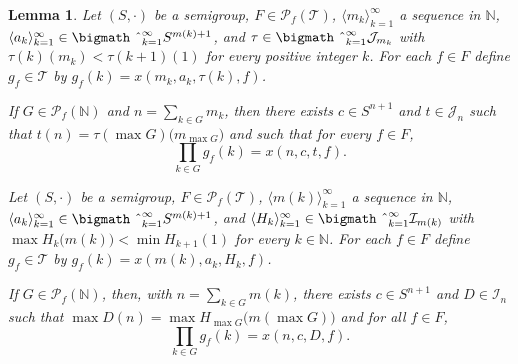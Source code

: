 \documentclass[12pt]{article}
\theoremstyle{plain}
\newtheorem{lem}[thm]{Lemma}
\theoremstyle{definition}
\newcommand{\la}{\langle}
\newcommand{\ra}{\rangle}
\newcommand{\bbN}{\mathbb{N}}
\newcommand{\calI}{\mathcal{I}}
\newcommand{\calJ}{\mathcal{J}}
\newcommand{\calT}{\mathcal{T}}
\newcommand{\Pf}{\mathcal{P}_f}
\newcommand{\bigtimes}{\hbox{\bigmath \char'2}}
\begin{document}
\begin{lem}
  \label{lem:prodrewrt}
  Let $(S, \cdot)$ be a semigroup, $F \in \Pf(\calT)$, $\la m_k \ra_{k=1}^\infty$ a sequence in $\bbN$, $\la a_k \ra_{k=1}^\infty \in \bigtimes_{k=1}^\infty S^{m(k)+1}$, and $\tau \in \bigtimes_{k=1}^\infty \calJ_{m_k}$ with $\tau(k)(m_k) < \tau(k+1)(1)$ for every positive integer $k$.
  For each $f \in F$ define $g_f \in \calT$ by $g_f(k) = x(m_k, a_k, \tau(k), f)$.

  If $G \in \Pf(\bbN)$ and $n = \sum_{k \in G} m_k$, then there exists $c \in S^{n+1}$ and $t \in \calJ_n$ such that $t(n) = \tau(\max G)\bigl( m_{\max G}\bigr)$ and such that for every $f \in F$, 
  \[
    \textstyle
    \prod_{k \in G} g_f(k) = x(n, c, t, f).
  \]
  
  Let $(S, \cdot)$ be  a semigroup, $F \in \Pf(\calT)$, $\la m(k)
  \ra_{k=1}^\infty$ a sequence in $\bbN$, $\la a_k \ra_{k=1}^\infty
  \in \bigtimes_{k=1}^\infty S^{m(k)+1}$, and $\la H_k
  \ra_{k=1}^\infty \in \bigtimes_{k=1}^\infty \calI_{m(k)}$ with $\max
  H_k\bigl(m(k)\bigr) < \min H_{k+1}(1)$ for every $k \in \bbN$.
  For each $f \in F$ define $g_f \in \calT$ by $g_f(k) = x(m(k), a_k,
  H_k, f)$. 

  If $G \in \Pf(\bbN)$, then, with $n = \sum_{k \in G} m(k)$, there
  exists $c \in S^{n+1}$ and $D \in \calI_n$ such that $\max D(n) =
  \max H_{\max G}\bigl(m(\max G)\bigr)$ and for all $f \in F$, 
  \[
    \prod_{k \in G} g_f(k) = x(n, c, D, f).
  \]
\end{lem}
\end{document}
